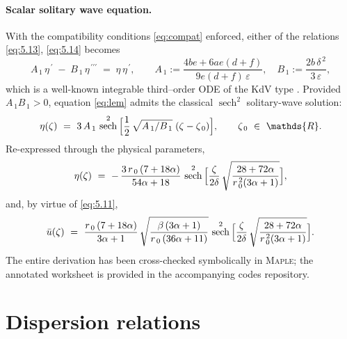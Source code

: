 \documentclass[alpha-refs, 12pt]{wiley-article}
\DeclareMathOperator{\sech}{sech}
\newcommand{\R}{\mathds{R}}
\newcommand{\eps}{\varepsilon}
\begin{document}
\paragraph{Scalar solitary wave equation.} With the compatibility conditions \eqref{eq:compat} enforced, either of the relations \eqref{eq:5.13}, \eqref{eq:5.14} becomes
\begin{equation}
  A_{\,1}\,\eta^{\,\prime}
  \;-\;
  B_{\,1}\,\eta^{\,\prime\prime\prime}
  \;=\;
  \eta\,\eta^{\,\prime},
  \qquad
  A_{\,1}:=\frac{4be+6ae(d+f)}{9e(d+f)\,\eps},
  \quad
  B_{\,1}:=\frac{2b\,\delta^{\,2}}{3\,\eps},
  \label{eq:lem}
\end{equation}
which is a well-known integrable third–order ODE of the KdV type \cite{Newell1977}.  Provided $A_{\,1}B_{\,1}>0$, equation \eqref{eq:lem} admits the classical $\sech^{2}$ solitary-wave solution:
\begin{equation*}
  \eta(\zeta)\ =\ 3\,A_{\,1}\,
  \sech^{2}\,\Bigl[
    \frac12\,\sqrt{A_{\,1}/B_{\,1}}\;(\zeta-\zeta_{\,0})
  \Bigr], \qquad \zeta_{\,0}\ \in\ \R.
\end{equation*}
Re-expressed through the physical parameters,
\begin{equation}
  \eta(\zeta)\ =\ -\,\frac{3\,r_{\,0}\,(7+18\alpha)}{54\alpha+18}\,
  \sech^{2}\,\Bigl[\frac{\zeta}{2\delta}\,\sqrt{\frac{28+72\alpha}{r_{\,0}^{\,2}(3\alpha+1)}}\Bigr], \label{eq:solitarybouss1}
\end{equation}
and, by virtue of \eqref{eq:5.11},
\begin{equation}
  \bar{u}(\zeta)\ =\ \frac{r_{\,0}\,(7+18\alpha)}{3\alpha+1}\,
  \sqrt{\frac{\beta\,(3\alpha+1)}{r_{\,0}\,(36\alpha+11)}}\,
  \sech^{2}\,\Bigl[\frac{\zeta}{2\delta}\,\sqrt{\frac{28+72\alpha}{r_{\,0}^{\,2}(3\alpha+1)}}\Bigr]. \label{eq:solitarybouss2}
\end{equation}
The entire derivation has been cross-checked symbolically in \textsc{Maple}; the annotated worksheet is provided in the accompanying codes repository.

\section{Dispersion relations}
\label{sec:disp}
\end{document}
